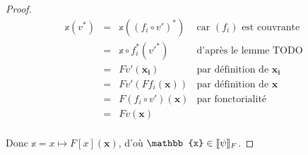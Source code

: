 \begin{proof}
    \[\begin{array}{rcll}
        \mathbb{x}(v^*) & = & \mathbb{x}((f_i\circ v')^*)
                                & \text{car $(f_i)$ est couvrante} \\
                        & = & \mathbb{x}\circ f_i^*(v'^*)
                                & \text{d'après le lemme TODO} \\
                        & = & Fv'(\mathbf{x_i})
                                & \text{par définition de }\mathbf{x_i}\\
                        & = & Fv'(Ff_i(\mathbf{x}))
                                & \text{par définition de }\mathbf{x} \\
                        & = & F(f_i\circ v')(\mathbf{x})
                                & \text{par fonctorialité} \\
                        & = & Fv(\mathbf{x}) & \\
    \end{array}\]

    Donc $\mathbb{x} = x\mapsto F[x](\mathbf{x})$, d'où $\mathbb{x}\in\sem{\psi}_F$.
\end{proof}


